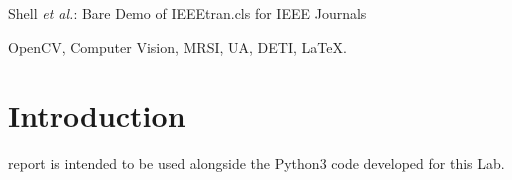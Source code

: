 \documentclass[journal]{IEEEtran}
\begin{document}
%
{Shell \MakeLowercase{\textit{et al.}}: Bare Demo of IEEEtran.cls for IEEE Journals}
% 











\maketitle


\begin{IEEEkeywords}
OpenCV, Computer Vision, MRSI, UA, DETI, \LaTeX.
\end{IEEEkeywords}






%
\IEEEpeerreviewmaketitle



\section{Introduction}
% 
% 
% 
% 
 report is intended to be used alongside the Python3 code 
developed for this Lab. 
\end{document}
